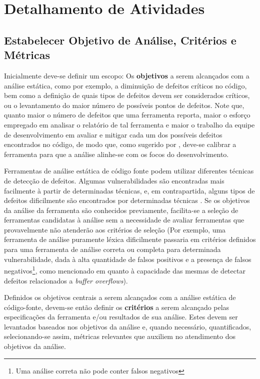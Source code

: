 \section{Detalhamento de Atividades}\label{metodologia_proposta:detalhamento_de_atividades}

\subsection{Estabelecer Objetivo de Análise, Critérios e Métricas}

Inicialmente deve-se definir um escopo: Os \textbf{objetivos} a serem alcançados com a análise estática, como por exemplo, a diminuição de defeitos críticos no código, bem como a definição de quais tipos de defeitos devem ser considerados críticos, ou o levantamento do maior número de possíveis pontos de defeitos. Note que, quanto maior o número de defeitos que uma ferramenta reporta, maior o esforço empregado em analisar o relatório de tal ferramenta e maior o trabalho da equipe de desenvolvimento em avaliar e mitigar cada um dos possíveis defeitos encontrados no código, de modo que, como sugerido por \cite{seatbelts}, deve-se calibrar a ferramenta para que a análise alinhe-se com os focos do desenvolvimento.

Ferramentas de análise estática de código fonte podem utilizar diferentes técnicas de detecção de defeitos. Algumas vulnerabilidades são encontradas mais facilmente à partir de determinadas técnicas, e, em contrapartida, alguns tipos de defeitos dificilmente são encontrados por determinadas técnicas \cite{harvard}. Se os objetivos da análise da ferramenta são conhecidos previamente, facilita-se a seleção de ferramentas candidatas à análise sem a necessidade de avaliar ferramentas que provavelmente não atenderão aos critérios de seleção (Por exemplo, uma ferramenta de análise puramente léxica dificilmente passaria em critérios definidos para uma ferramenta de análise correta ou completa para determinada vulnerabilidade, dada à alta quantidade de falsos positivos e a presença de falsos negativos\footnote{Uma análise correta não pode conter falsos negativos}, como mencionado em \cite{harvard} quanto à capacidade das mesmas de detectar defeitos relacionados a \textit{buffer overflows}).

Definidos os objetivos centrais a serem alcançados com a análise estática de código-fonte, devem-se então definir os \textbf{critérios} a serem alcançado pelas especificações da ferramenta e/ou resultados de sua análise. Estes devem ser levantados baseados nos objetivos da análise e, quando necessário, quantificados, selecionando-se assim, métricas relevantes que auxiliem no atendimento dos objetivos da análise.


